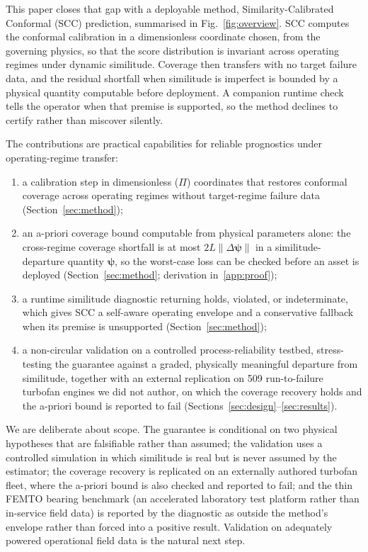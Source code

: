 This paper closes that gap with a deployable method, Similarity-Calibrated Conformal (SCC)
prediction, summarised in Fig.~\ref{fig:overview}. SCC computes the conformal calibration in a
dimensionless coordinate chosen, from the governing physics, so that the score distribution is
invariant across operating regimes under dynamic similitude. Coverage then transfers with no target
failure data, and the residual shortfall when similitude is imperfect is bounded by a physical
quantity computable before deployment. A companion runtime check tells the operator when that
premise is supported, so the method declines to certify rather than miscover silently.

The contributions are practical capabilities for reliable prognostics under operating-regime
transfer:
\begin{enumerate}
\item a calibration step in dimensionless ($\Pi$) coordinates that restores conformal coverage
across operating regimes without target-regime failure data (Section~\ref{sec:method});
\item an a-priori coverage bound computable from physical parameters alone: the cross-regime
coverage shortfall is at most $2L\lVert\Delta\boldsymbol\psi\rVert$ in a similitude-departure
quantity $\boldsymbol\psi$, so the worst-case loss can be checked before an asset is deployed
(Section~\ref{sec:method}; derivation in~\ref{app:proof});
\item a runtime similitude diagnostic returning holds, violated, or indeterminate, which gives SCC a
self-aware operating envelope and a conservative fallback when its premise is unsupported
(Section~\ref{sec:method});
\item a non-circular validation on a controlled process-reliability testbed, stress-testing the
guarantee against a graded, physically meaningful departure from similitude, together with an
external replication on 509 run-to-failure turbofan engines we did not author, on which the
coverage recovery holds and the a-priori bound is reported to fail
(Sections~\ref{sec:design}--\ref{sec:results}).
\end{enumerate}

We are deliberate about scope. The guarantee is conditional on two physical hypotheses that are
falsifiable rather than assumed; the validation uses a controlled simulation in which similitude is
real but is never assumed by the estimator; the coverage recovery is replicated on an externally
authored turbofan fleet, where the a-priori bound is also checked and reported to fail; and the thin
FEMTO bearing benchmark (an accelerated laboratory test platform rather than in-service field data)
is reported by the diagnostic as outside the method's envelope rather than forced into a positive
result. Validation on adequately powered operational field data is the natural next step.
